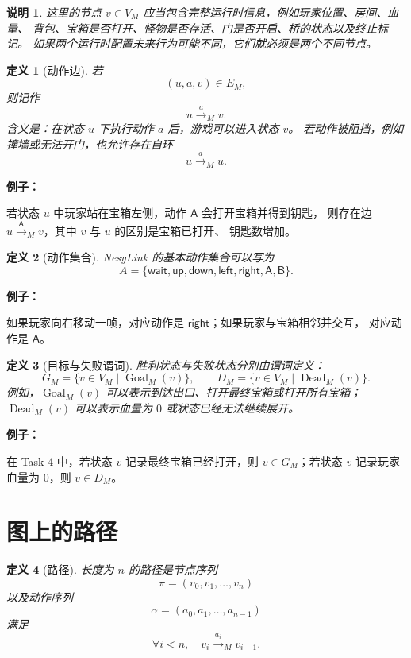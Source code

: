 \documentclass[UTF8]{ctexart}
\theoremstyle{nesylinkblock}
\newtheorem{definition}{定义}
\newtheorem{remark}{说明}
\DeclareMathOperator{\Goal}{Goal}
\DeclareMathOperator{\Dead}{Dead}
\newenvironment{examplebox}
  {\begin{center}\begin{lrbox}{\exampleboxcontent}\begin{minipage}{0.92\linewidth}
   \textbf{例子：}\par\smallskip}
  {\end{minipage}\end{lrbox}\fbox{\usebox{\exampleboxcontent}}\end{center}}
\begin{document}
\begin{remark}
这里的节点 $v\in V_M$ 应当包含完整运行时信息，例如玩家位置、房间、血量、
背包、宝箱是否打开、怪物是否存活、门是否开启、桥的状态以及终止标记。
如果两个运行时配置未来行为可能不同，它们就必须是两个不同节点。
\end{remark}

\begin{definition}[动作边]
若
\[
  (u,a,v)\in E_M,
\]
则记作
\[
  u \xrightarrow{a}_M v.
\]
含义是：在状态 $u$ 下执行动作 $a$ 后，游戏可以进入状态 $v$。
若动作被阻挡，例如撞墙或无法开门，也允许存在自环
\[
  u \xrightarrow{a}_M u.
\]
\end{definition}

\begin{examplebox}
若状态 $u$ 中玩家站在宝箱左侧，动作 $\mathsf{A}$ 会打开宝箱并得到钥匙，
则存在边 $u\xrightarrow{\mathsf{A}}_M v$，其中 $v$ 与 $u$ 的区别是宝箱已打开、
钥匙数增加。
\end{examplebox}

\begin{definition}[动作集合]
NesyLink 的基本动作集合可以写为
\[
  A=
  \{
    \mathsf{wait},
    \mathsf{up},
    \mathsf{down},
    \mathsf{left},
    \mathsf{right},
    \mathsf{A},
    \mathsf{B}
  \}.
\]
\end{definition}

\begin{examplebox}
如果玩家向右移动一帧，对应动作是 $\mathsf{right}$；如果玩家与宝箱相邻并交互，
对应动作是 $\mathsf{A}$。
\end{examplebox}

\begin{definition}[目标与失败谓词]
胜利状态与失败状态分别由谓词定义：
\[
  G_M=\{v\in V_M\mid \Goal_M(v)\},
  \qquad
  D_M=\{v\in V_M\mid \Dead_M(v)\}.
\]
例如，$\Goal_M(v)$ 可以表示到达出口、打开最终宝箱或打开所有宝箱；
$\Dead_M(v)$ 可以表示血量为 $0$ 或状态已经无法继续展开。
\end{definition}

\begin{examplebox}
在 Task 4 中，若状态 $v$ 记录最终宝箱已经打开，则 $v\in G_M$；若状态 $v$
记录玩家血量为 $0$，则 $v\in D_M$。
\end{examplebox}

\section{图上的路径}

\begin{definition}[路径]
长度为 $n$ 的路径是节点序列
\[
  \pi=(v_0,v_1,\ldots,v_n)
\]
以及动作序列
\[
  \alpha=(a_0,a_1,\ldots,a_{n-1})
\]
满足
\[
  \forall i<n,\quad v_i\xrightarrow{a_i}_M v_{i+1}.
\]
\end{definition}
\end{document}
